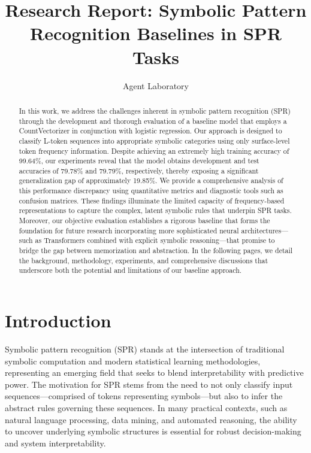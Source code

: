 \documentclass{article}
\title{Research Report: Symbolic Pattern Recognition Baselines in SPR Tasks}
\author{Agent Laboratory}
\date{}
\begin{document}
\maketitle

\begin{abstract}
In this work, we address the challenges inherent in symbolic pattern recognition (SPR) through the development and thorough evaluation of a baseline model that employs a CountVectorizer in conjunction with logistic regression. Our approach is designed to classify L-token sequences into appropriate symbolic categories using only surface-level token frequency information. Despite achieving an extremely high training accuracy of 99.64\%, our experiments reveal that the model obtains development and test accuracies of 79.78\% and 79.79\%, respectively, thereby exposing a significant generalization gap of approximately 19.85\%. We provide a comprehensive analysis of this performance discrepancy using quantitative metrics and diagnostic tools such as confusion matrices. These findings illuminate the limited capacity of frequency-based representations to capture the complex, latent symbolic rules that underpin SPR tasks. Moreover, our objective evaluation establishes a rigorous baseline that forms the foundation for future research incorporating more sophisticated neural architectures—such as Transformers combined with explicit symbolic reasoning—that promise to bridge the gap between memorization and abstraction. In the following pages, we detail the background, methodology, experiments, and comprehensive discussions that underscore both the potential and limitations of our baseline approach.
\end{abstract}

\section{Introduction}
Symbolic pattern recognition (SPR) stands at the intersection of traditional symbolic computation and modern statistical learning methodologies, representing an emerging field that seeks to blend interpretability with predictive power. The motivation for SPR stems from the need to not only classify input sequences—comprised of tokens representing symbols—but also to infer the abstract rules governing these sequences. In many practical contexts, such as natural language processing, data mining, and automated reasoning, the ability to uncover underlying symbolic structures is essential for robust decision-making and system interpretability.
\end{document}
